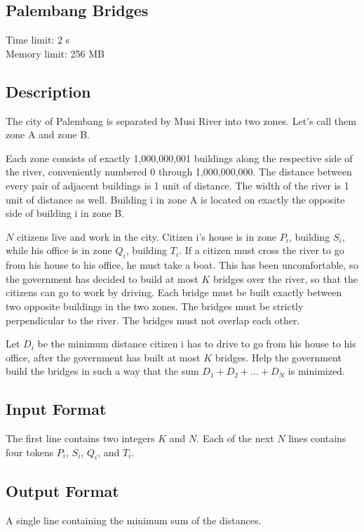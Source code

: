 \documentclass[a4paper]{article}
\begin{document}
\newpage
\begin{center}
\section*{Palembang Bridges}
Time limit: 2 s\\
Memory limit: 256 MB
\end{center}

\subsection*{Description}
\indent

The city of Palembang is separated by Musi River into two zones. Let's call them zone A and zone B.

Each zone consists of exactly 1,000,000,001 buildings along the respective side of the river, conveniently numbered 0 through 1,000,000,000. The distance between every pair of adjacent buildings is 1 unit of distance. The width of the river is 1 unit of distance as well. Building i in zone A is located on exactly the opposite side of building i in zone B.

$N$ citizens live and work in the city. Citizen i's house is in zone $P_i$, building $S_i$, while his office is in zone $Q_i$, building $T_i$. If a citizen must cross the river to go from his house to his office, he must take a boat. This has been uncomfortable, so the government has decided to build at most $K$ bridges over the river, so that the citizens can go to work by driving. Each bridge must be built exactly between two opposite buildings in the two zones. The bridges must be strictly perpendicular to the river. The bridges must not overlap each other.

Let $D_i$ be the minimum distance citizen i has to drive to go from his house to his office, after the government has built at most $K$ bridges. Help the government build the bridges in such a way that the sum $D_1 + D_2 + ... + D_N$ is minimized.

\subsection*{Input Format}
The first line contains two integers $K$ and $N$. Each of the next $N$ lines contains four tokens $P_i$, $S_i$, $Q_i$, and $T_i$.

\subsection*{Output Format}
A single line containing the minimum sum of the distances.
\end{document}
